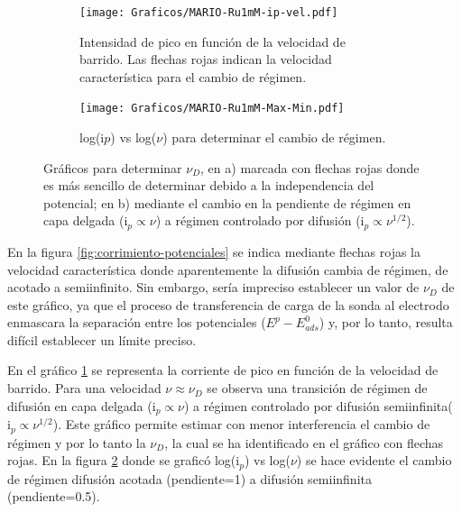          	 \begin{figure}[b!]
			 	 \begin{subfigure}[t]{0.5\textwidth}
			 	 \texttt{[image: Graficos/MARIO-Ru1mM-ip-vel.pdf]}
				  \caption{Intensidad de pico  en función de la velocidad de barrido. Las flechas rojas indican la velocidad característica para el cambio de régimen.}
			 	 \label{fig:ip-vel}
		  	  	 \end{subfigure}	
			 	 \begin{subfigure}[t]{0.5\textwidth}
			  	 \texttt{[image: Graficos/MARIO-Ru1mM-Max-Min.pdf]}
			  	 \caption{log(i$p$) vs log($\nu$) para determinar el cambio de régimen.}
			 	 \label{fig:logj-logv}
		  		 \end{subfigure}
				  \caption[Cálculo de velocidad de barrido característica]{Gráficos para determinar $\nu_{\scriptscriptstyle{D}}$, en a) marcada con flechas rojas donde es más sencillo de determinar debido a la independencia del potencial; en b) mediante el cambio en la pendiente de  régimen en capa delgada ($\text{i}_{p} \propto \nu$) a régimen controlado por difusión ($\text{i}_{p} \propto \nu^{1/2}$).}
			 	 \label{fig:ip-vel2}
			 	 \end{figure}
		   
		 En la figura \ref{fig:corrimiento-potenciales} se indica mediante flechas rojas la velocidad característica donde aparentemente la difusión cambia de régimen, de acotado a semiinfinito. Sin embargo, sería impreciso establecer un valor de $\nu_{\scriptscriptstyle{D}}$ de este gráfico, ya que el proceso de transferencia de carga de la sonda al electrodo enmascara la separación entre los potenciales ($E^p-E^0_{ads}$) y, por lo tanto, resulta difícil establecer un límite preciso.
		   	 	 
         En el gráfico \ref{fig:ip-vel} se representa la corriente de pico en función de la velocidad de barrido. Para una velocidad $\nu \approx \nu_{\scriptscriptstyle{D}}$ se observa una transición de régimen de difusión en capa delgada ($\text{i}_{p} \propto \nu$) a régimen controlado por difusión semiinfinita($\text{i}_{p} \propto \nu^{1/2}$). Este gráfico permite estimar con menor interferencia el cambio de régimen y por lo tanto la $\nu_{\scriptscriptstyle{D}}$, la cual se ha identificado en el gráfico con flechas rojas. En la figura \ref{fig:logj-logv} donde se graficó log({i$_p$}) vs log({$\nu$}) se hace evidente el cambio de régimen difusión acotada (pendiente=1) a difusión semiinfinita (pendiente=0.5).

